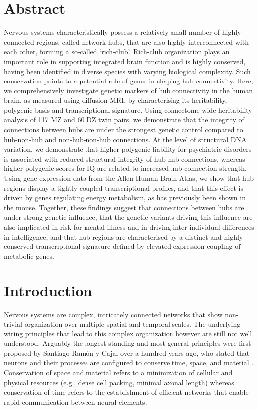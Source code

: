 \section*{Abstract}
Nervous systems characteristically possess a relatively small number of highly connected regions, called network hubs, that are also highly interconnected with each other, forming a so-called `rich-club’. Rich-club organization plays an important role in supporting integrated brain function and is highly conserved, having been identified in diverse species with varying biological complexity. Such conservation points to a potential role of genes in shaping hub connectivity. Here, we comprehensively investigate genetic markers of hub connectivity in the human brain, as measured using diffusion MRI, by characterising its heritability, polygenic basis and transcriptional signature. Using connectome-wide heritability analysis of 117 MZ and 60 DZ twin pairs, we demonstrate that the integrity of connections between hubs are under the strongest genetic control compared to hub-non-hub and non-hub-non-hub connections. At the level of structural DNA variation, we demonstrate that higher polygenic liability for psychiatric disorders is associated with reduced structural integrity of hub-hub connections, whereas higher polygenic scores for IQ are related to increased hub connection strength. Using gene expression data from the Allen Human Brain Atlas, we show that hub regions display a tightly coupled transcriptional profiles, and that this effect is driven by genes regulating energy metabolism, as has previously been shown in the mouse.  Together, these findings suggest that connections between hubs are under strong genetic influence, that the genetic variants driving this influence are also implicated in risk for mental illness and in driving inter-individual differences in intelligence, and that hub regions are characterised by a distinct and highly conserved transcriptional signature defined by elevated expression coupling of metabolic genes.

\section{Introduction}

Nervous systems are complex, intricately connected networks that show non-trivial organization over multiple spatial and temporal scales. The underlying wiring principles that lead to this complex organization however are still not well understood. Arguably the longest-standing and most general principles were first proposed by Santiago Ram\'{o}n y Cajal over a hundred years ago, who stated that neurons and their processes are configured to conserve time, space, and material \citep{RamonyCajal1995}. Conservation of space and material refers to a minimization of cellular and physical resources (e.g., dense cell packing, minimal axonal length) whereas conservation of time refers to the establishment of efficient networks that enable rapid communication between neural elements.

